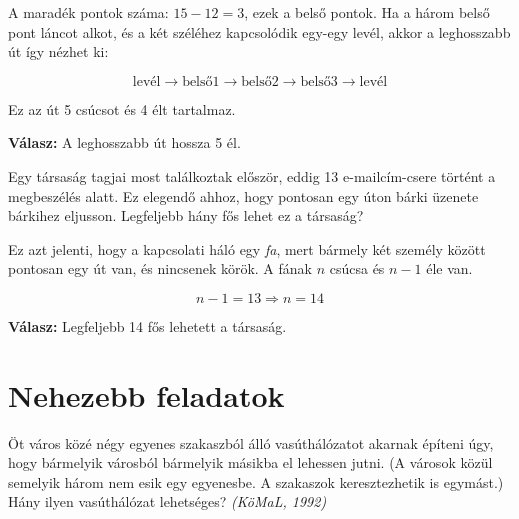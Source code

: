 \begin{solution}
A maradék pontok száma: $15-12=3$, ezek a belső pontok. Ha a három
belső pont láncot alkot, és a két széléhez kapcsolódik egy-egy levél,
akkor a leghosszabb út így nézhet ki:

\[
\text{levél}\rightarrow\text{belső1}\rightarrow\text{belső2}\rightarrow\text{belső3}\rightarrow\text{levél}
\]

Ez az út 5 csúcsot és 4 élt tartalmaz.

\noindent\textbf{Válasz:} A leghosszabb út hossza 5 él.
\end{solution}
\begin{problem}
Egy társaság tagjai most találkoztak először, eddig 13 e-mailcím-csere
történt a megbeszélés alatt. Ez elegendő ahhoz, hogy pontosan egy
úton bárki üzenete bárkihez eljusson. Legfeljebb hány fős lehet ez
a társaság? 
\end{problem}

\begin{solution}
Ez azt jelenti, hogy a kapcsolati háló egy \emph{fa}, mert bármely
két személy között pontosan egy út van, és nincsenek körök. A fának
$n$ csúcsa és $n-1$ éle van.

\[
n-1=13\Rightarrow n=14
\]

\noindent\textbf{Válasz:} Legfeljebb 14 fős lehetett a társaság.
\end{solution}

\section*{Nehezebb feladatok}
\begin{extraproblem}
Öt város közé négy egyenes szakaszból álló vasúthálózatot akarnak
építeni úgy, hogy bármelyik városból bármelyik másikba el lehessen
jutni. (A városok közül semelyik három nem esik egy egyenesbe. A szakaszok
keresztezhetik is egymást.) Hány ilyen vasúthálózat lehetséges? \emph{(KöMaL,
1992) }
\end{extraproblem}

